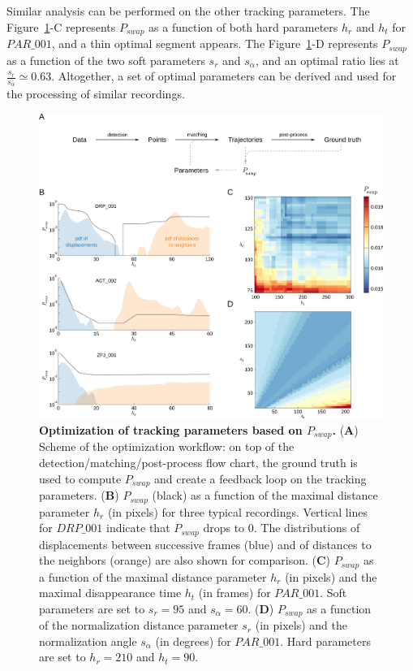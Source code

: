     Similar analysis can be performed on the other tracking parameters. The Figure~\ref{part_1:fig_4}-C represents $P_{swap}$ as a function of both hard parameters $h_r$ and $h_t$ for $PAR\_001$, and a thin optimal segment appears. The Figure~\ref{part_1:fig_4}-D represents $P_{swap}$ as a function of the two soft parameters $s_r$ and $s_\alpha$, and an optimal ratio lies at $\frac{s_r}{s_\alpha} \simeq 0.63$. Altogether, a set of optimal parameters can be derived and used for the processing of similar recordings.

    \begin{figure}[h!]
    \centering
    \includegraphics[width=1\textwidth]{part_1/assets/Figure_4.png}
    \caption{{\bf Optimization of tracking parameters based on $P_{swap}$.}
        (\textbf{A}) Scheme of the optimization workflow: on top of the detection/matching/post-process flow chart, the ground truth is used to compute $P_{swap}$ and create a feedback loop on the tracking parameters.
        (\textbf{B}) $P_{swap}$ (black) as a function of the maximal distance parameter $h_r$ (in pixels) for three typical recordings. Vertical lines for $DRP\_001$ indicate  that $P_{swap}$ drops to 0. The distributions of displacements between successive frames (blue) and of distances to the neighbors (orange) are also shown for comparison.
        (\textbf{C}) $P_{swap}$ as a function of the maximal distance parameter $h_r$ (in pixels) and the maximal disappearance time $h_t$ (in frames) for $PAR\_001$. Soft parameters are set to $s_r = 95$ and $s_\alpha = 60$.
        (\textbf{D}) $P_{swap}$ as a function of the normalization distance parameter $s_r$ (in pixels) and the normalization angle $s_\alpha$ (in degrees) for $PAR\_001$. Hard parameters are set to $h_r = 210$ and $h_t = 90$.}
    \label{part_1:fig_4}
    \end{figure}
	

